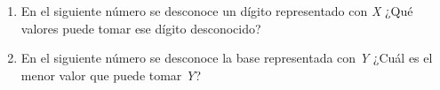\documentclass[12pt]{article}
\begin{document}
\begin{enumerate}

    \item En el siguiente número se desconoce un dígito representado con
        \emph{X} ¿Qué valores puede tomar ese dígito desconocido?


    \item En el siguiente número se desconoce la base representada con
        \emph{Y} ¿Cuál es el menor valor que puede tomar \emph{Y}?


\end{enumerate}
\end{document}
